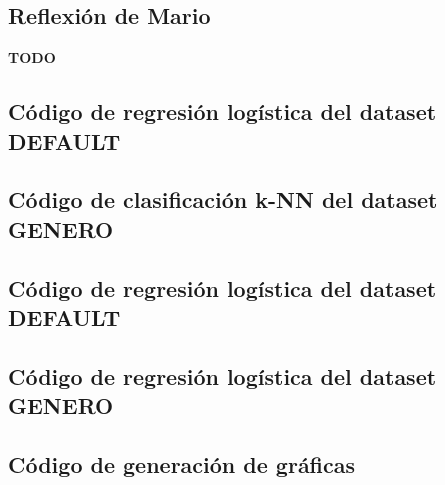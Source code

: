 \documentclass[sigconf,authorversion,nonacm]{acmart}
\begin{document}
\subsection{Reflexión de Mario}
\textbf{TODO}





\clearpage

\appendix

\lstset{style=customstyle}

\begin{figure*}
 \section{Código de regresión logística del dataset DEFAULT}
  \label{appendix:nn_default}
  
\end{figure*}

\begin{figure*}
  \section{Código de clasificación k-NN del dataset GENERO}
  \label{appendix:nn_genero}
  
\end{figure*}

\begin{figure*}
  \section{Código de regresión logística del dataset DEFAULT}
  \label{appendix:reg_default}
  
\end{figure*}

\begin{figure*}
  \section{Código de regresión logística del dataset GENERO}
  \label{appendix:reg_genero}
  
\end{figure*}

\begin{figure*}
  \section{Código de generación de gráficas}
  \label{appendix:graphs}
  
\end{figure*}
\end{document}
